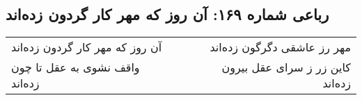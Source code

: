 \begin{center}
\section*{رباعی شماره ۱۶۹: آن روز که مهر کار گردون زده‌اند}
\label{sec:sh169}
\begin{longtable}{l p{0.5cm} r}
آن روز که مهر کار گردون زده‌اند
&&
مهر رز عاشقی دگرگون زده‌اند
\\
واقف نشوی به عقل تا چون زده‌اند
&&
کاین زر ز سرای عقل بیرون زده‌اند
\\
\end{longtable}
\end{center}
